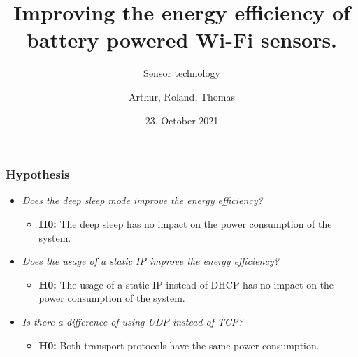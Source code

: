 \documentclass{beamer}
\date{23. October 2021}
\title{Improving the energy efficiency of battery powered Wi-Fi sensors.}
\subtitle{Sensor technology}
\author{Arthur, Roland, Thomas}
\begin{document}
\begin{frame}
    \titlepage
\end{frame}











\begin{frame}
    \frametitle{Hypothesis}

    \begin{itemize}
        \item \textit{Does the deep sleep mode improve the energy efficiency?}
        \begin{itemize}
            \item \textbf{H0:} The deep sleep has no impact on the power consumption of the system.
        \end{itemize}
        \item \textit{Does the usage of a static IP improve the energy efficiency?}
        \begin{itemize}
            \item \textbf{H0:} The usage of a static IP instead of DHCP has no impact on the power consumption of the system.
        \end{itemize}
        \item \textit{Is there a difference of using UDP instead of TCP?}
        \begin{itemize}
            \item \textbf{H0:} Both transport protocols have the same power consumption. 
        \end{itemize}
    \end{itemize}
\end{frame}
\end{document}
